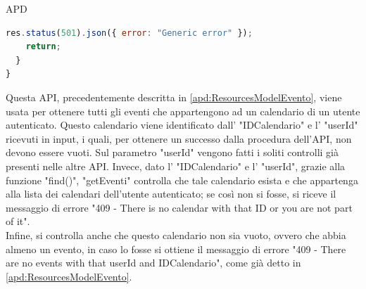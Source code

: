 \begin{listaPersonale} {APD}
\begin{listaPersonale2}[APD]{}
\begin{lstlisting}[language=JavaScript]
    res.status(501).json({ error: "Generic error" });
    return;
  }
}
                \end{lstlisting}
                \newpage
                Questa API, precedentemente descritta in \ref{apd:ResourcesModelEvento}, viene usata per ottenere tutti gli eventi che appartengono ad un calendario di un utente autenticato. Questo calendario viene identificato dall' "IDCalendario" e l' "userId" ricevuti in input, i quali, per ottenere un successo dalla procedura dell'API, non devono essere vuoti. Sul parametro "userId" vengono fatti i soliti controlli già presenti nelle altre API. Invece, dato l' "IDCalendario" e l' "userId", grazie alla funzione "find()", "getEventi" controlla che tale calendario esista e che appartenga alla lista dei calendari dell'utente autenticato; se così non si fosse, si riceve il messaggio di errore "409 - There is no calendar with that ID or you are not part of it". \\
                Infine, si controlla anche che questo calendario non sia vuoto, ovvero che abbia almeno un evento, in caso lo fosse si ottiene il messaggio di errore "409 - There are no events with that userId and IDCalendario", come già detto in \ref{apd:ResourcesModelEvento}.

\end{listaPersonale2}
\end{listaPersonale}
